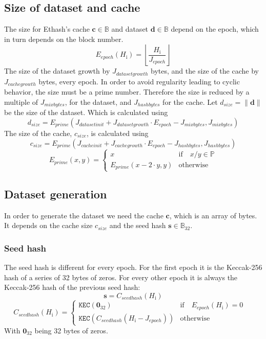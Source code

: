 \documentclass[9pt,oneside]{amsart}
\makeatletter
\newcommand{\linkdest}[1]{\Hy@raisedlink{\hypertarget{#1}{}}}
\makeatother
\begin{document}
\subsection{Size of dataset and cache}
The size for Ethash's cache $\mathbf{c} \in \mathbb{B}$  and dataset $\mathbf{d} \in \mathbb{B}$ depend on the epoch, which in turn depends on the block number.
\begin{equation}
 E_{epoch}(H_{\mathrm{i}}) = \left\lfloor\frac{H_{\mathrm{i}}}{J_{epoch}}\right\rfloor
\end{equation}
The size of the dataset growth by $J_{datasetgrowth}$ bytes, and the size of the cache by $J_{cachegrowth}$ bytes, every epoch. In order to avoid regularity leading to cyclic behavior, the size must be a prime number. Therefore the size is reduced by a multiple of $J_{mixbytes}$, for the dataset, and $J_{hashbytes}$ for the cache.
\linkdest{d__size}{}Let $d_{size} = \lVert \mathbf{d} \rVert$ be the size of the dataset. Which is calculated using
\begin{equation}
 d_{size} = E_{prime}(J_{datasetinit} + J_{datasetgrowth} \cdot E_{epoch} - J_{mixbytes}, J_{mixbytes})
\end{equation}
The size of the cache, $c_{size}$, is calculated using
\begin{equation}
 c_{size} = E_{prime}(J_{cacheinit} + J_{cachegrowth} \cdot E_{epoch} - J_{hashbytes}, J_{hashbytes})
\end{equation}
\begin{equation}
 E_{prime}(x, y) = \begin{cases}
x & \text{if} \quad x / y \in \mathbb{P} \\
E_{prime}(x - 2 \cdot y, y) & \text{otherwise}
\end{cases}
\end{equation}
\subsection{Dataset generation}
In order to generate the dataset we need the cache $\mathbf{c}$, which is an array of bytes. It depends on the cache size  $c_{size}$ and the seed hash $\mathbf{s} \in \mathbb{B}_{32}$.
\subsubsection{Seed hash}
The seed hash is different for every epoch. For the first epoch it is the Keccak-256 hash of a series of 32 bytes of zeros. For every other epoch it is always the Keccak-256 hash of the previous seed hash:
\begin{equation}
 \mathbf{s} = C_{seedhash}(H_{\mathrm{i}})
\end{equation}
\begin{equation}
 C_{seedhash}(H_{\mathrm{i}}) = \begin{cases}
\texttt{KEC}(\mathbf{0}_{32}) & \text{if} \quad E_{epoch}(H_{\mathrm{i}}) = 0 \quad  \\
\texttt{KEC}(C_{seedhash}(H_{\mathrm{i}} - J_{epoch})) & \text{otherwise}
\end{cases}
\end{equation}
With $\mathbf{0}_{32}$ being 32 bytes of zeros.
\end{document}
